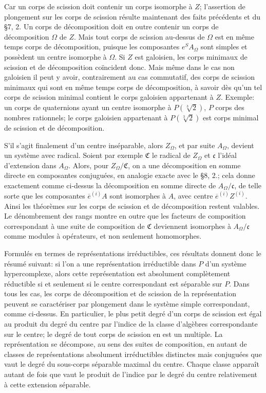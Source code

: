 Car un corps de scission doit contenir un corps isomorphe à \(Z\); l'assertion de plongement sur les corps de scission résulte maintenant des faits précédents et du \S 7, 2. Un corps de décomposition doit en outre contenir un corps de décomposition \(\Omega\) de \(Z\). Mais tout corps de scission au-dessus de \(\Omega\) est en même temps corps de décomposition, puisque les composantes \(e^S A_\Omega\) sont simples et possèdent un centre isomorphe à \(\Omega\). Si \(Z\) est galoisien, les corps minimaux de scission et de décomposition coïncident donc. Mais même dans le cas non galoisien il peut y avoir, contrairement au cas commutatif, des corps de scission minimaux qui sont en même temps corps de décomposition, à savoir dès qu'un tel corps de scission minimal contient le corps galoisien appartenant à \(Z\). Exemple: un corps de quaternions ayant un centre isomorphe à \(P(\sqrt[3]{2})\), \(P\) corps des nombres rationnels; le corps galoisien appartenant à \(P(\sqrt[3]{2})\) est corps minimal de scission et de décomposition.

S'il s'agit finalement d'un centre inséparable, alors \(Z_\Omega\), et par suite \(A_\Omega\), devient un système avec radical. Soient par exemple \(\mathfrak C\) le radical de \(Z_\Omega\) et \(\mathfrak c\) l'idéal d'extension dans \(A_\Omega\). Alors, pour \(Z_\Omega/\mathfrak C\), on a une décomposition en somme directe en composantes conjuguées, en analogie exacte avec le \S 8, 2.; cela donne exactement comme ci-dessus la décomposition en somme directe de \(A_\Omega/\mathfrak c\), de telle sorte que les composantes \(\overline e^{(i)}A\) sont isomorphes à \(A\), avec centre \(\overline e^{(i)}Z^{(i)}\). Ainsi les théorèmes sur les corps de scission et de décomposition restent valables. Le dénombrement des rangs montre en outre que les facteurs de composition correspondant à une suite de composition de \(\mathfrak C\) deviennent isomorphes à \(A_\Omega/\mathfrak c\) comme modules à opérateurs, et non seulement homomorphes.

Formulés en termes de représentations irréductibles, ces résultats donnent donc le résumé suivant: si l'on a une représentation irréductible dans \(P\) d'un système hypercomplexe, alors cette représentation est absolument complètement réductible si et seulement si le centre correspondant est séparable sur \(P\). Dans tous les cas, les corps de décomposition et de scission de la représentation peuvent se caractériser par plongement dans le système simple correspondant, comme ci-dessus. En particulier, le plus petit degré d'un corps de scission est égal au produit du degré du centre par l'indice de la classe d'algèbres correspondante sur le centre; le degré de tout corps de scission en est un multiple. La représentation se décompose, au sens des suites de composition, en autant de classes de représentations absolument irréductibles distinctes mais conjuguées que vaut le degré du sous-corps séparable maximal du centre. Chaque classe apparaît autant de fois que vaut le produit de l'indice par le degré du centre relativement à cette extension séparable.

